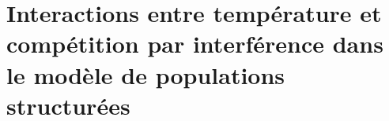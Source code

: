 \documentclass[12pt,a4paper,twoside,openright,final]{memoir}
\newif\iflofimage
\numberwithin{chapter}{part}
\begin{document}



\chapter{Interactions entre température et compétition par interférence dans le
modèle de populations structurées}

%

%

\backmatter

\begin{Spacing}{1}
\printbibliography[title={Bibliographie}]

\newpage 
\listoftables
\newpage 
\lofimagetrue
\listoffigures
\lofimagefalse

\end{Spacing}
\end{document}
